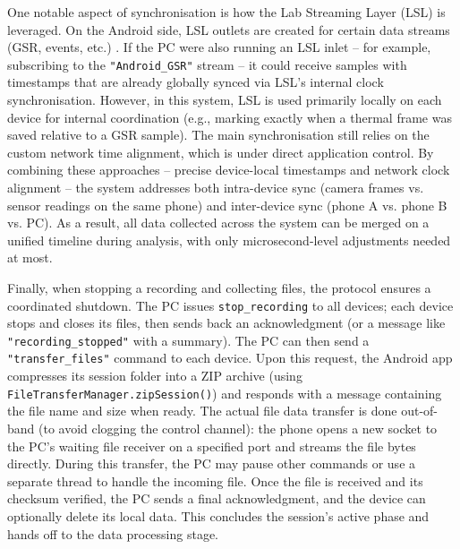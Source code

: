 One notable aspect of synchronisation is how the Lab Streaming Layer (LSL) is leveraged. On the Android side, LSL outlets are created for certain data streams (GSR, events, etc.) \cite{ref9}. If the PC were also running an LSL inlet -- for example, subscribing to the \texttt{"Android\_GSR"} stream -- it could receive samples with timestamps that are already globally synced via LSL's internal clock synchronisation. However, in this system, LSL is used primarily locally on each device for internal coordination (e.g., marking exactly when a thermal frame was saved relative to a GSR sample). The main synchronisation still relies on the custom network time alignment, which is under direct application control. By combining these approaches -- precise device-local timestamps and network clock alignment -- the system addresses both intra-device sync (camera frames vs. sensor readings on the same phone) and inter-device sync (phone A vs. phone B vs. PC). As a result, all data collected across the system can be merged on a unified timeline during analysis, with only microsecond-level adjustments needed at most.

Finally, when stopping a recording and collecting files, the protocol ensures a coordinated shutdown. The PC issues \texttt{stop\_recording} to all devices; each device stops and closes its files, then sends back an acknowledgment (or a message like \texttt{"recording\_stopped"} with a summary). The PC can then send a \texttt{"transfer\_files"} command to each device. Upon this request, the Android app compresses its session folder into a ZIP archive (using \texttt{FileTransferManager.zipSession()}) and responds with a message containing the file name and size when ready. The actual file data transfer is done out-of-band (to avoid clogging the control channel): the phone opens a new socket to the PC's waiting file receiver on a specified port and streams the file bytes directly. During this transfer, the PC may pause other commands or use a separate thread to handle the incoming file. Once the file is received and its checksum verified, the PC sends a final acknowledgment, and the device can optionally delete its local data. This concludes the session's active phase and hands off to the data processing stage.

